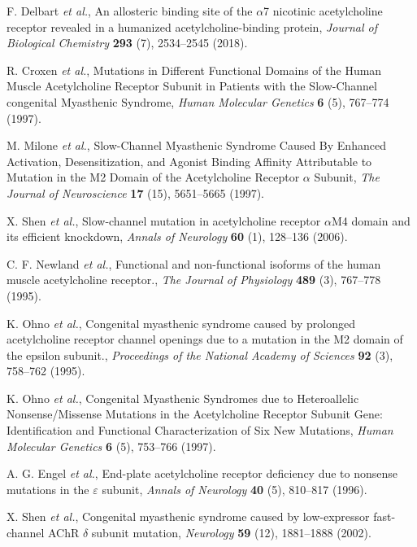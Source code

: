 F. Delbart {\em et al.}, An allosteric binding site of the $\alpha$7 nicotinic acetylcholine receptor revealed in a humanized acetylcholine-binding protein, {\em Journal of Biological Chemistry} {\bf 293} (7), 2534--2545 (2018).

R. Croxen {\em et al.}, Mutations in Different Functional Domains of the Human Muscle Acetylcholine Receptor   Subunit in Patients with the Slow-Channel congenital Myasthenic Syndrome, {\em Human Molecular Genetics} {\bf 6} (5), 767--774 (1997).

M. Milone {\em et al.}, Slow-Channel Myasthenic Syndrome Caused By Enhanced Activation, Desensitization, and Agonist Binding Affinity Attributable to Mutation in the M2 Domain of the Acetylcholine Receptor $\alpha$ Subunit, {\em The Journal of Neuroscience} {\bf 17} (15), 5651--5665 (1997).

X. Shen {\em et al.}, Slow-channel mutation in acetylcholine receptor $\alpha$M4 domain and its efficient knockdown, {\em Annals of Neurology} {\bf 60} (1), 128--136 (2006).

C. F. Newland {\em et al.}, Functional and non-functional isoforms of the human muscle acetylcholine receptor., {\em The Journal of Physiology} {\bf 489} (3), 767--778 (1995).

K. Ohno {\em et al.}, Congenital myasthenic syndrome caused by prolonged acetylcholine receptor channel openings due to a mutation in the M2 domain of the epsilon subunit., {\em Proceedings of the National Academy of Sciences} {\bf 92} (3), 758--762 (1995).

K. Ohno {\em et al.}, Congenital Myasthenic Syndromes due to Heteroallelic Nonsense/Missense Mutations in the Acetylcholine Receptor   Subunit Gene: Identification and Functional Characterization of Six New Mutations, {\em Human Molecular Genetics} {\bf 6} (5), 753--766 (1997).

A. G. Engel {\em et al.}, End-plate acetylcholine receptor deficiency due to nonsense mutations in the $\varepsilon$ subunit, {\em Annals of Neurology} {\bf 40} (5), 810--817 (1996).

X. Shen {\em et al.}, Congenital myasthenic syndrome caused by low-expressor fast-channel AChR $\delta$ subunit mutation, {\em Neurology} {\bf 59} (12), 1881--1888 (2002).

